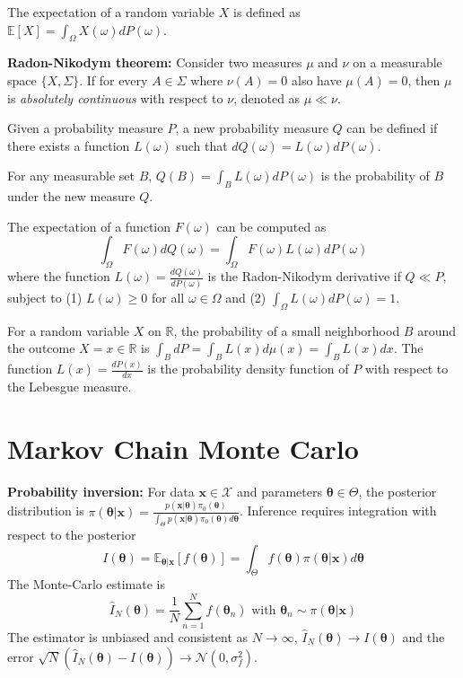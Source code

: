 \documentclass[12pt]{article}
\begin{document}
The expectation of a random variable $X$ is defined as $\mathbb{E}[X] = \int_\Omega X(\omega) dP(\omega)$.

\textbf{Radon-Nikodym theorem:} Consider two measures $\mu$ and $\nu$ on a measurable space $\{X, \Sigma\}$. If for every $A \in \Sigma$ where $\nu(A) = 0$ also have $\mu(A) = 0$, then $\mu$ is \textit{absolutely continuous} with respect to $\nu$, denoted as $\mu \ll \nu$.

Given a probability measure $P$, a new probability measure $Q$ can be defined if there exists a function $L(\omega)$ such that $dQ(\omega) = L(\omega) dP(\omega)$.

For any measurable set $B$, $Q(B) = \int_B L(\omega) dP(\omega)$ is the probability of $B$ under the new measure $Q$.

The expectation of a function $F(\omega)$ can be computed as
$$
\int_\Omega F(\omega) dQ(\omega) = \int_\Omega F(\omega) L(\omega) dP(\omega)
$$
where the function $L(\omega) = \frac{dQ(\omega)}{dP(\omega)}$ is the Radon-Nikodym derivative if $Q \ll P$, subject to (1) $L(\omega) \geq 0$ for all $\omega \in \Omega$ and (2) $\int_\Omega L(\omega) dP(\omega) = 1$.

For a random variable $X$ on $\mathbb{R}$, the probability of a small neighborhood $B$ around the outcome $X = x \in \mathbb{R}$ is $\int_B dP = \int_B L(x) d\mu(x) = \int_B L(x) dx$. The function $L(x) = \frac{dP(x)}{dx}$ is the probability density function of $P$ with respect to the Lebesgue measure.

\section{Markov Chain Monte Carlo}
\textbf{Probability inversion:} For data $\mathbf{x} \in \mathcal{X}$ and parameters $\boldsymbol{\theta} \in \Theta$, the posterior distribution is
$
\pi (\boldsymbol{\theta} | \mathbf{x}) = \frac{p(\mathbf{x} | \boldsymbol{\theta}) \pi_0(\boldsymbol{\theta})}{\int_\Theta p(\mathbf{x} | \boldsymbol{\theta}) \pi_0(\boldsymbol{\theta}) d\boldsymbol{\theta}}
$.
Inference requires integration with respect to the posterior
$$
I(\boldsymbol{\theta}) = \mathbb{E}_{\boldsymbol{\theta} | \mathbf{x}}[f(\boldsymbol{\theta})] = \int_\Theta f(\boldsymbol{\theta}) \pi(\boldsymbol{\theta} | \mathbf{x}) d\boldsymbol{\theta}
$$
The Monte-Carlo estimate is 
$$
\hat{I}_N(\boldsymbol{\theta}) = \frac{1}{N} \sum_{n=1}^N f(\boldsymbol{\theta}_n) \text{ with } \boldsymbol{\theta}_n \sim \pi(\boldsymbol{\theta} | \mathbf{x})
$$
The estimator is unbiased and consistent as $N \to \infty$, $\hat{I}_N(\boldsymbol{\theta}) \to I(\boldsymbol{\theta})$ and the error $\sqrt{N} (\hat{I}_N(\boldsymbol{\theta}) - I(\boldsymbol{\theta})) \to \mathcal{N}(0, \sigma_f^2)$.
\end{document}
